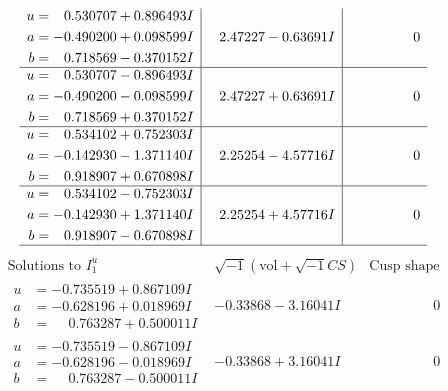 \documentclass[1p]{elsarticle_modified}
\theoremstyle{definition}
\newcommand{\I}{\sqrt{-1}}
\begin{document}
$$\begin{array}{c|c|c}
\begin{aligned}
u &= \phantom{-}0.530707 + 0.896493 I \\
a &= -0.490200 + 0.098599 I \\
b &= \phantom{-}0.718569 - 0.370152 I\end{aligned}
 & \phantom{-}2.47227 - 0.63691 I & \phantom{-0.000000 } 0 \\ \hline\begin{aligned}
u &= \phantom{-}0.530707 - 0.896493 I \\
a &= -0.490200 - 0.098599 I \\
b &= \phantom{-}0.718569 + 0.370152 I\end{aligned}
 & \phantom{-}2.47227 + 0.63691 I & \phantom{-0.000000 } 0 \\ \hline\begin{aligned}
u &= \phantom{-}0.534102 + 0.752303 I \\
a &= -0.142930 - 1.371140 I \\
b &= \phantom{-}0.918907 + 0.670898 I\end{aligned}
 & \phantom{-}2.25254 - 4.57716 I & \phantom{-0.000000 } 0 \\ \hline\begin{aligned}
u &= \phantom{-}0.534102 - 0.752303 I \\
a &= -0.142930 + 1.371140 I \\
b &= \phantom{-}0.918907 - 0.670898 I\end{aligned}
 & \phantom{-}2.25254 + 4.57716 I & \phantom{-0.000000 } 0\\
 \hline 
 \end{array}$$\newpage$$\begin{array}{c|c|c}  
\text{Solutions to }I^u_{1}& \I (\text{vol} + \sqrt{-1}CS) & \text{Cusp shape}\\
 \hline 
\begin{aligned}
u &= -0.735519 + 0.867109 I \\
a &= -0.628196 + 0.018969 I \\
b &= \phantom{-}0.763287 + 0.500011 I\end{aligned}
 & -0.33868 - 3.16041 I & \phantom{-0.000000 } 0 \\ \hline\begin{aligned}
u &= -0.735519 - 0.867109 I \\
a &= -0.628196 - 0.018969 I \\
b &= \phantom{-}0.763287 - 0.500011 I\end{aligned}
 & -0.33868 + 3.16041 I & \phantom{-0.000000 } 0 \\ \hline\begin{aligned}

\end{aligned}
\end{array}$$
\end{document}
